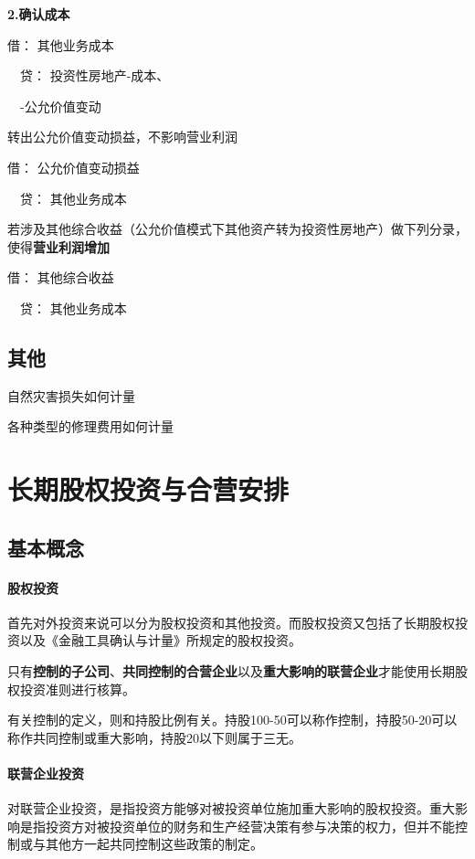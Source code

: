 \documentclass[UTF8,12pt]{ctexart}
\newenvironment{Dr}{\noindent 借：}{\par}
\newenvironment{Cr}{\noindent \ \ 贷：}{\par}
\numberwithin{equation}{section} %
\numberwithin{figure}{section}
\numberwithin{table}{section}
\begin{document}
	
	\textbf{2.确认成本}
	
	\begin{Dr}
		其他业务成本
	\end{Dr}
	\begin{Cr}
		投资性房地产-成本、
		
		\ \ -公允价值变动
	\end{Cr}
	
	
	转出公允价值变动损益，不影响营业利润
	
	\begin{Dr}
		公允价值变动损益
	\end{Dr}
	\begin{Cr}
		其他业务成本
	\end{Cr}
	
	若涉及其他综合收益（公允价值模式下其他资产转为投资性房地产）做下列分录，使得\textbf{营业利润增加}
	
	\begin{Dr}
		其他综合收益
	\end{Dr}
	\begin{Cr}
		其他业务成本
	\end{Cr}

	\subsection{其他}
	自然灾害损失如何计量
	
	各种类型的修理费用如何计量
	
	\newpage
	\section{长期股权投资与合营安排}
	\subsection{基本概念}
	\paragraph{股权投资}
	首先对外投资来说可以分为股权投资和其他投资。而股权投资又包括了长期股权投资以及《金融工具确认与计量》所规定的股权投资。
	
	只有\textbf{控制的子公司}、\textbf{共同控制的合营企业}以及\textbf{重大影响的联营企业}才能使用长期股权投资准则进行核算。
	
	有关控制的定义，则和持股比例有关。持股100-50可以称作控制，持股50-20可以称作共同控制或重大影响，持股20以下则属于三无。
	
	\paragraph{联营企业投资}
	对联营企业投资，是指投资方能够对被投资单位施加重大影响的股权投资。重大影响是指投资方对被投资单位的财务和生产经营决策有参与决策的权力，但并不能控制或与其他方一起共同控制这些政策的制定。
	
\end{document}
